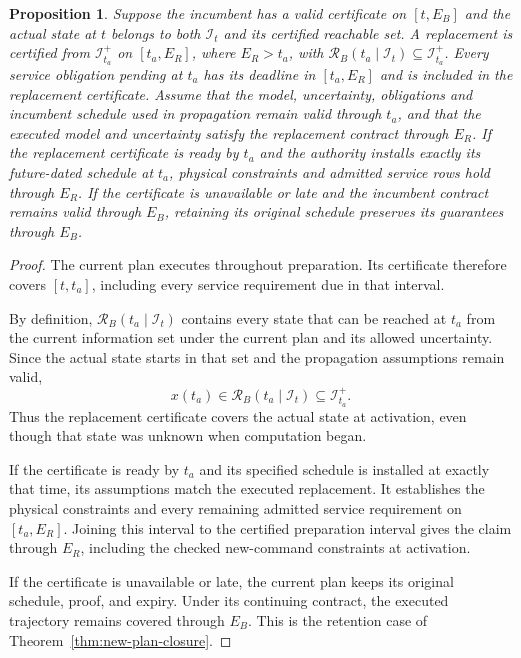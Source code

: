 \documentclass[preprint,12pt]{elsarticle}
\newtheorem{proposition}{Proposition}
\begin{document}
\begin{proposition}
\label{prop:planned-handover}
Suppose the incumbent has a valid certificate on $[t,E_B]$ and the
actual state at $t$ belongs to both $\mathcal I_t$ and its certified
reachable set. A replacement is certified from $\mathcal I_{t_a}^+$ on
$[t_a,E_R]$, where $E_R>t_a$, with
$\mathcal R_B(t_a\mid\mathcal I_t)\subseteq\mathcal I_{t_a}^+$.
Every service obligation pending at $t_a$ has its deadline in $[t_a,E_R]$
and is included in the replacement certificate. Assume that the model,
uncertainty, obligations and incumbent schedule used in propagation
remain valid through $t_a$, and that the executed model and uncertainty
satisfy the replacement contract through $E_R$.
If the replacement certificate is ready by
$t_a$ and the authority installs exactly its future-dated schedule at $t_a$,
physical constraints and admitted service rows hold through $E_R$.
If the certificate is unavailable or late and the incumbent contract
remains valid through $E_B$, retaining its original schedule preserves
its guarantees through $E_B$.
\end{proposition}

\begin{proof}
The current plan executes throughout preparation. Its certificate
therefore covers $[t,t_a]$, including every service requirement due in
that interval.

By definition, $\mathcal R_B(t_a\mid\mathcal I_t)$ contains every state
that can be reached at $t_a$ from the current information set under the
current plan and its allowed uncertainty. Since the actual state starts
in that set and the propagation assumptions remain valid,
\[
 x(t_a)\in\mathcal R_B(t_a\mid\mathcal I_t)
          \subseteq\mathcal I_{t_a}^+.
\]
Thus the replacement certificate covers the actual state at activation,
even though that state was unknown when computation began.

If the certificate is ready by $t_a$ and its specified schedule is
installed at exactly that time, its assumptions match the executed
replacement. It establishes the physical constraints and every remaining
admitted service requirement on $[t_a,E_R]$. Joining this interval to the
certified preparation interval gives the claim through $E_R$, including
the checked new-command constraints at activation.

If the certificate is unavailable or late, the current plan keeps its
original schedule, proof, and expiry. Under its continuing contract, the
executed trajectory remains covered through $E_B$. This is the retention
case of Theorem~\ref{thm:new-plan-closure}.
\end{proof}
\end{document}
